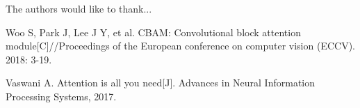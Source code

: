 \documentclass[journal]{IEEEtran}
\begin{document}
The authors would like to thank...


\ifCLASSOPTIONcaptionsoff
  \newpage
\fi



\begin{thebibliography}{1}

	Woo S, Park J, Lee J Y, et al. CBAM: Convolutional block attention module[C]//Proceedings of the European conference on computer vision (ECCV). 2018: 3-19.

Vaswani A. Attention is all you need[J]. Advances in Neural Information Processing Systems, 2017.

\end{thebibliography}


\end{document}
